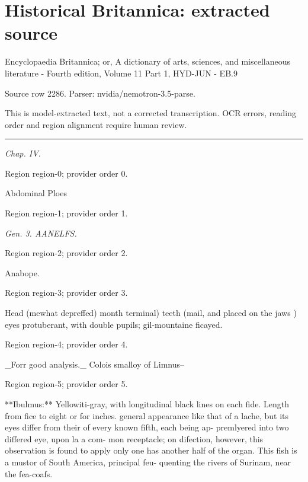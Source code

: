 \documentclass[11pt]{article}
\begin{document}
\section*{Historical Britannica: extracted source}
Encyclopaedia Britannica; or, A dictionary of arts, sciences, and miscellaneous literature - Fourth edition, Volume 11 Part 1, HYD-JUN - EB.9\par
{\small Source row 2286. Parser: nvidia/nemotron-3.5-parse.\par}
{\small This is model-extracted text, not a corrected transcription. OCR errors, reading order and region alignment require human review.\par}
\hrule\medskip
{\small\itshape Chap. IV.\par}

{\scriptsize\color{gray} Region region-0; provider order 0.\par}
\medskip

Abdominal
Ploes
\par

{\scriptsize\color{gray} Region region-1; provider order 1.\par}
\medskip

{\small\itshape Gen. 3. AANELFS.\par}

{\scriptsize\color{gray} Region region-2; provider order 2.\par}
\medskip

Anabope.
\par

{\scriptsize\color{gray} Region region-3; provider order 3.\par}
\medskip

Head (mewhat depreffed) month terminal) teeth (mail,
and placed on the jaws ) eyes protuberant, with
double pupils; gil-mountaine ficayed.
\par

{\scriptsize\color{gray} Region region-4; provider order 4.\par}
\medskip

\_Forr good analysis.\_ Colois smalloy of Limnus--
\par

{\scriptsize\color{gray} Region region-5; provider order 5.\par}
\medskip

**Ibulmus:** Yellowiti-gray, with longitudinal black lines on each
fide. Length from fice to eight or for inches.
general appearance like that of a lache, but its eyes
differ from their of every known fifth, each being ap-
premlyered into two differed eye, upon la a com-
mon receptacle; on difection, however, this observation
is found to apply only one has another half of the organ.
This fish is a mustor of South America, principal feu-
quenting the rivers of Surinam, near the fea-coafs.
\par
\end{document}
